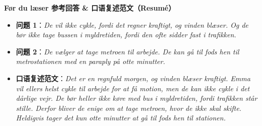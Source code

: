 \begin{answerbox}
\textbf{Før du læser 参考回答 \& 口语复述范文（Resumé）}
\begin{itemize}
  \item \textbf{问题 1}：\textit{De vil ikke cykle, fordi det regner kraftigt, og vinden blæser. Og de bør ikke tage bussen i myldretiden, fordi den ofte sidder fast i trafikken.}
  \item \textbf{问题 2}：\textit{De vælger at tage metroen til arbejde. De kan gå til fods hen til metrostationen med en paraply på otte minutter.}
  \item \textbf{口语复述范文}：\textit{Det er en regnfuld morgen, og vinden blæser kraftigt. Emma vil ellers helst cykle til arbejde for at få motion, men de kan ikke cykle i det dårlige vejr. De bør heller ikke køre med bus i myldretiden, fordi trafikken står stille. Derfor bliver de enige om at tage metroen, hvor de ikke skal skifte. Heldigvis tager det kun otte minutter at gå til fods hen til stationen.}
\end{itemize}
\end{answerbox}
